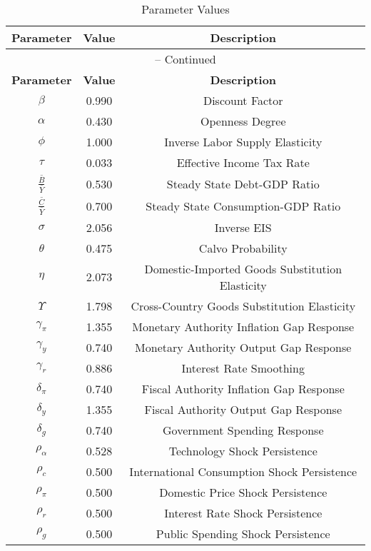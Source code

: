 \begin{center}
\begin{longtable}{ccc}
\caption{Parameter Values}\\%
\toprule%
\multicolumn{1}{c}{\textbf{Parameter}} &
\multicolumn{1}{c}{\textbf{Value}} &
 \multicolumn{1}{c}{\textbf{Description}}\\%
\midrule%
\endfirsthead
\multicolumn{3}{c}{{\tablename} \thetable{} -- Continued}\\%
\midrule%
\multicolumn{1}{c}{\textbf{Parameter}} &
\multicolumn{1}{c}{\textbf{Value}} &
  \multicolumn{1}{c}{\textbf{Description}}\\%
\midrule%
\endhead
$\beta$ 	 & 	 0.990 	 & 	 Discount Factor\\
$\alpha$ 	 & 	 0.430 	 & 	 Openness Degree\\
$\phi$ 	 & 	 1.000 	 & 	 Inverse Labor Supply Elasticity\\
$\tau$ 	 & 	 0.033 	 & 	 Effective Income Tax Rate\\
$\frac{\bar{B}}{\bar{Y}}$ 	 & 	 0.530 	 & 	 Steady State Debt-GDP Ratio\\
$\frac{\bar{C}}{\bar{Y}}$ 	 & 	 0.700 	 & 	 Steady State Consumption-GDP Ratio\\
$\sigma$ 	 & 	 2.056 	 & 	 Inverse EIS\\
$\theta$ 	 & 	 0.475 	 & 	 Calvo Probability\\
$\eta$ 	 & 	 2.073 	 & 	 Domestic-Imported Goods Substitution Elasticity\\
$\Upsilon$ 	 & 	 1.798 	 & 	 Cross-Country Goods Substitution Elasticity\\
$\gamma_{\pi}$ 	 & 	 1.355 	 & 	 Monetary Authority Inflation Gap Response\\
$\gamma_{y}$ 	 & 	 0.740 	 & 	 Monetary Authority Output Gap Response\\
$\gamma_{r}$ 	 & 	 0.886 	 & 	 Interest Rate Smoothing\\
$\delta_{\pi}$ 	 & 	 0.740 	 & 	 Fiscal Authority Inflation Gap Response\\
$\delta_{y}$ 	 & 	 1.355 	 & 	 Fiscal Authority Output Gap Response\\
$\delta_{g}$ 	 & 	 0.740 	 & 	 Government Spending Response\\
$\rho_{\alpha}$ 	 & 	 0.528 	 & 	 Technology Shock Persistence\\
$\rho_{c}$ 	 & 	 0.500 	 & 	 International Consumption Shock Persistence\\
$\rho_{\pi}$ 	 & 	 0.500 	 & 	 Domestic Price Shock Persistence\\
$\rho_{r}$ 	 & 	 0.500 	 & 	 Interest Rate Shock Persistence\\
$\rho_{g}$ 	 & 	 0.500 	 & 	 Public Spending Shock Persistence\\
\bottomrule%
\end{longtable}
\end{center}
